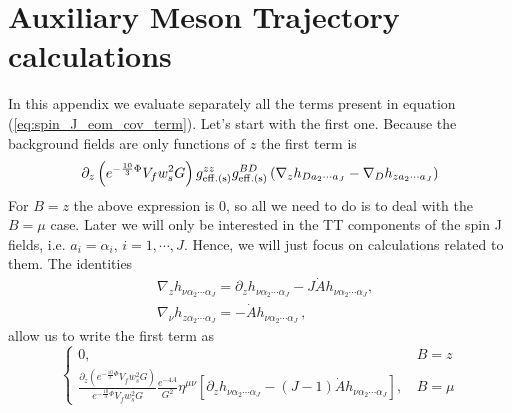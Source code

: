 \documentclass[a4paper,12pt]{article}
\begin{document}
\section{Auxiliary Meson Trajectory calculations}
\label{appendix:meson_trajectory_eom}

In this appendix we evaluate separately all the terms present in equation (\ref{eq:spin_J_eom_cov_term}).
Let's start with the first one. Because the background fields are only functions of $z$ the first term is
\begin{equation}
\partial_z\left( e^{-\frac{10}{3} \Phi} V_f w_s^2 G \right) g^{zz}_{\rm{eff. (s)}}g^{BD}_{\rm{eff. (s)}}\left(\nabla_z h_{D a_2 \cdots a_J} - \nabla_D h_{z a_2 \cdots a_J}\right)
\label{eq:spin_j_eom_first_term}
\end{equation}
For $B = z$ the above expression is 0, so all we need to do is to deal with the $B=\mu$ case. Later we will only be interested in the TT components of the spin J fields, i.e. $a_i = \alpha_i, \, i = 1,\cdots, J$.  Hence, we will just focus on calculations related to them.
The identities
\begin{align}
& \nabla_z h_{\nu \alpha_2 \cdots \alpha_J} = \partial_z h_{\nu \alpha_2 \cdots \alpha_J} - J \dot{A} h_{\nu \alpha_2 \cdots \alpha_J}, \\
& \nabla_\nu h_{z \alpha_2 \cdots \alpha_J} = - \dot{A} h_{\nu \alpha_2 \cdots \alpha_J} \, ,
\label{eq:spin_J_cod_id_1}
\end{align}
allow us to write the first term as
\begin{equation}
\begin{cases}
0, & B = z \\
\frac{\partial_{z}\left( e^{-\frac{10}{3} \Phi} V_f w_s^2 G \right)}{ e^{-\frac{10}{3} \Phi} V_f w_s^2 G} \frac{e^{-4A}}{G^2} \eta^{\mu \nu} \left[ \partial_z h_{\nu \alpha_2 \cdots \alpha_J} - \left(J-1\right) \dot{A} h_{\nu \alpha_2 \cdots \alpha_J} \right], \, &B = \mu
\end{cases}
\end{equation}
\end{document}
